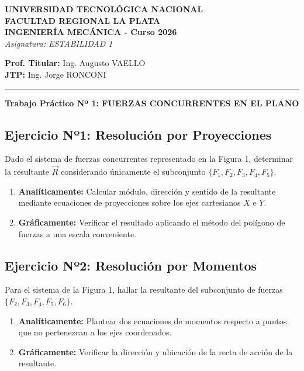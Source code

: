 \documentclass[11pt,a4paper]{article}
\begin{document}
\begin{center}
    \textbf{UNIVERSIDAD TECNOLÓGICA NACIONAL \\ FACULTAD REGIONAL LA PLATA} \\
    \vspace{0.2cm}
    \textbf{INGENIERÍA MECÁNICA - Curso 2026} \\
    \vspace{0.2cm}
    \textit{Asignatura: ESTABILIDAD 1}
\end{center}

\vspace{0.3cm}

\begin{flushleft}
    \textbf{Prof. Titular:} Ing. Augusto VAELLO \\
    \textbf{JTP:} Ing. Jorge RONCONI \\
\end{flushleft}

\noindent\rule{\linewidth}{0.4pt}

\begin{center}
    \vspace{0.4cm}
    \Large \textbf{Trabajo Práctico Nº 1: FUERZAS CONCURRENTES EN EL PLANO} \\
    \vspace{0.4cm}
\end{center}

\subsection*{Ejercicio Nº1: Resolución por Proyecciones}
Dado el sistema de fuerzas concurrentes representado en la Figura 1, determinar la resultante $\vec{R}$ considerando únicamente el subconjunto $\{F_1, F_2, F_3, F_4, F_5\}$.
\begin{enumerate}[label=\alph*)]
    \item \textbf{Analíticamente:} Calcular módulo, dirección y sentido de la resultante mediante ecuaciones de proyecciones sobre los ejes cartesianos $X$ e $Y$.
    \item \textbf{Gráficamente:} Verificar el resultado aplicando el método del polígono de fuerzas a una escala conveniente.
\end{enumerate}


\subsection*{Ejercicio Nº2: Resolución por Momentos}
Para el sistema de la Figura 1, hallar la resultante del subconjunto de fuerzas $\{F_2, F_3, F_4, F_5, F_6\}$.
\begin{enumerate}[label=\alph*)]
    \item \textbf{Analíticamente:} Plantear dos ecuaciones de momentos respecto a puntos que no pertenezcan a los ejes coordenados.
    \item \textbf{Gráficamente:} Verificar la dirección y ubicación de la recta de acción de la resultante.
\end{enumerate}
\end{document}
